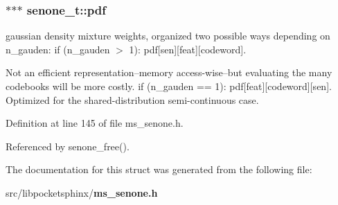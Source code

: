 \subsubsection[{pdf}]{$\ast$$\ast$$\ast$ senone\+\_\+t\+::pdf}\label{structsenone__t_aa7e23dc8a18875bad1c1b9c322f3cad4}


gaussian density mixture weights, organized two possible ways depending on n\+\_\+gauden\+: if (n\+\_\+gauden $>$ 1)\+: pdf[sen][feat][codeword]. 

Not an efficient representation--memory access-\/wise--but evaluating the many codebooks will be more costly. if (n\+\_\+gauden == 1)\+: pdf[feat][codeword][sen]. Optimized for the shared-\/distribution semi-\/continuous case. 

Definition at line 145 of file ms\+\_\+senone.\+h.



Referenced by senone\+\_\+free().



The documentation for this struct was generated from the following file\+:\begin{DoxyCompactItemize}
\item 
src/libpocketsphinx/{\bf ms\+\_\+senone.\+h}\end{DoxyCompactItemize}
